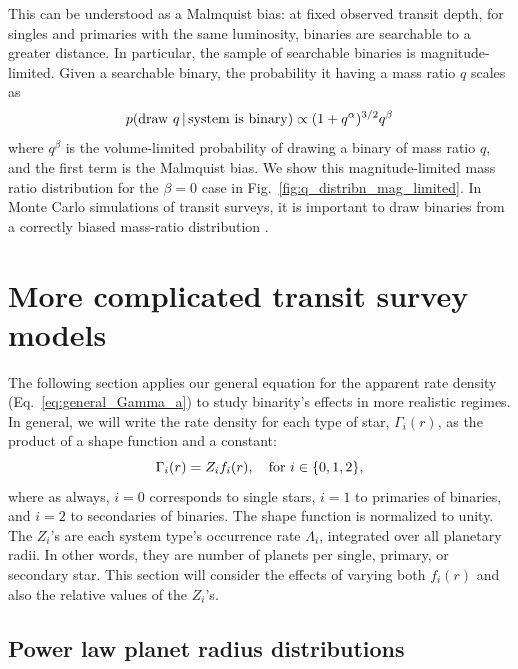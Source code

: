 \documentclass[12pt,modern]{aastex61}
\begin{document}
This can be understood as a Malmquist bias: at fixed observed transit 
depth, for singles and primaries with the same luminosity, binaries are 
searchable to a greater distance.
In particular, the sample of searchable binaries is magnitude-limited.
Given a searchable binary, the probability it having a mass ratio $q$ 
scales as
\begin{equation}
p({\rm draw\ }q\,|\,{\rm system\ is\ binary}) \propto 
(1+q^\alpha)^{3/2} q^\beta 
\label{eq:Malmquist_bias}
\end{equation}
where $q^\beta$ is the volume-limited probability of drawing a binary of mass 
ratio $q$, and the first term is the Malmquist bias.
We show this magnitude-limited mass ratio distribution for the $\beta=0$ case 
in Fig.~\ref{fig:q_distribn_mag_limited}.
In Monte Carlo simulations of transit surveys, it is 
important to draw binaries from a correctly biased mass-ratio distribution 
\citep[\textit{e.g.},][]{bakos_hatsouth:_2013,sullivan_transiting_2015,
    gunther_new_2017}.


%

\section{More complicated transit survey models}
\label{sec:more_complicated}
The following section applies our general equation for the apparent rate 
density (Eq.~\ref{eq:general_Gamma_a}) to study binarity's effects in more 
realistic regimes.
In general, we will write the rate density for each type of star, 
$\Gamma_i(r)$, as the product of a shape function and a constant:
\begin{equation}
\Gamma_i(r) = Z_i f_i(r), \quad {\rm for\ }i\in\{0,1,2\},
\end{equation}
where as always, $i=0$ corresponds to single stars, $i=1$ to primaries of 
binaries, and $i=2$ to secondaries of binaries.
The shape function is normalized to unity.
The $Z_i$'s are each system type's occurrence rate $\Lambda_i$, integrated 
over all planetary radii. In other words, they are number of planets per 
single, primary, or secondary star.
This section will consider the effects of varying both $f_i(r)$ and also the
relative values of the $Z_i$'s.

\subsection{Power law planet radius distributions}
\label{sec:model_2}
\end{document}
